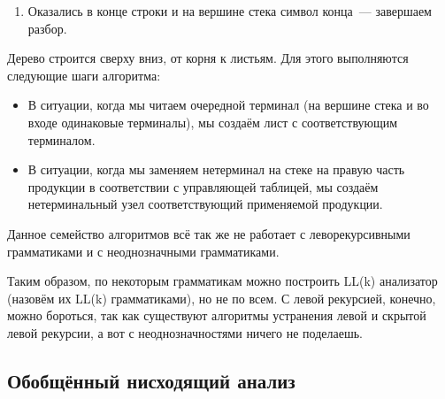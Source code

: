 \begin{example}
\begin{enumerate}
    Стек: \,
    \begin{tabular}[c]{ |c| }
        \\ \hline
        \$ \\ \hline
    \end{tabular}
    \qquad  \qquad \qquad  \qquad входное слово: \,
    \begin{tabular}[c]{ |c|c|c|c|c| }
        \hline
        a & b & a & b & \textcolor{red}{\$} \\ \hline
    \end{tabular}

    \begin{center}
      \resizebox{6cm}{3.5cm}{
      
    }
  \end{center}

\item Оказались в конце строки и на вершине стека символ конца~--- завершаем разбор.

\end{enumerate}

\end{example}

Дерево строится сверху вниз, от корня к листьям. Для этого выполняются следующие шаги алгоритма:
\begin{itemize}
  \item В ситуации, когда мы читаем очередной терминал (на вершине стека и во входе одинаковые терминалы), мы создаём лист с соответствующим терминалом.
  \item В ситуации, когда мы заменяем нетерминал на стеке на правую часть продукции в соответствии с управляющей таблицей, мы создаём нетерминальный узел соответствующий применяемой продукции.
\end{itemize}

Данное семейство алгоритмов всё так же не работает с леворекурсивными грамматиками и с неоднозначными грамматиками.

Таким образом, по некоторым грамматикам можно построить LL(k) анализатор (назовём их LL(k) грамматиками), но не по всем.
С левой рекурсией, конечно, можно бороться, так как существуют алгоритмы устранения левой и скрытой левой рекурсии, а вот с неоднозначностями ничего не поделаешь.


\subsection{Обобщённый нисходящий анализ}

